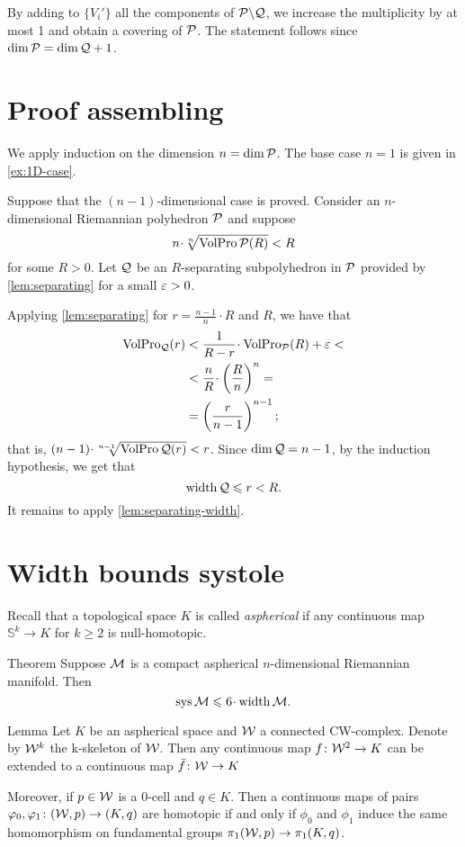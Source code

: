 By adding to  $\{V_i'\}$ all the components of $\mathcal{P}\backslash \mathcal{Q}$,
we increase the multiplicity by at most 1 and obtain a covering of $\mathcal{P}$.
The statement follows since $\dim \spc{P}= \dim \spc{Q}\z+1$.
\qeds

\section*{Proof assembling}

We apply induction on the dimension $n=\operatorname{\rm dim}\nolimits\mathcal{P}$.
The base case $n=1$ is given in \ref{ex:1D-case}.

Suppose that the  $(n-1)$-dimensional case is proved.
Consider an $n$-dimensional Riemannian polyhedron $\mathcal{P}$ and suppose
\[n\cdot \sqrt[n]{\VolPro\spc{P}(R)}< R\]
for some $R>0$.
Let $\mathcal{Q}$ be an $R$-separating subpolyhedron in $\mathcal{P}$ provided by \ref{lem:separating} for a small $\varepsilon>0$.

Applying  \ref{lem:separating} for $r=\tfrac{n-1}n\cdot R$ and $R$, we have that 
\begin{align*}
\VolPro_\spc{Q}(r) &< \frac 1{R-r}\cdot \VolPro_\spc{P}(R)+\eps<
\\
&<\frac {n}{R}\cdot\left(\frac{R}{n}\right)^n=
\\
&=\left(\frac{r}{n-1}\right)^{n-1};
\end{align*}
that is, $(n-1)\cdot \sqrt[n-1]{\VolPro\spc{Q}(r)}< r$.
Since $\operatorname{\rm dim}\nolimits\mathcal{Q}= n-1$, by the induction hypothesis, we get that
\[\operatorname{\rm width}\nolimits\mathcal{Q}\leqslant r<R.\]
It remains to apply \ref{lem:separating-width}.
\qeds





\section{Width bounds systole}

Recall that a topological space $K$ is called \emph{aspherical} if any continuous map $\mathbb{S}^k\to K$ for $k\ge 2$ is null-homotopic.

\begin{thm}{Theorem}\label{thm:sys<width}
Suppose $\mathcal{M}$ is a compact aspherical $n$-dimensional Riemannian manifold.
Then 
\[\sys\spc{M}\le 6 \cdot \width \spc{M}.\]
\end{thm}

\begin{thm}{Lemma}\label{lem:aspherical-homotopy}
Let $K$ be an aspherical space and $\mathcal{W}$ a connected CW-complex.
Denote by $\mathcal{W}^k$ the k-skeleton of $\mathcal{W}$.
Then any continuous map $f\colon\mathcal{W}^2\to K$ can be extended to a continuous map $\bar f\colon\mathcal{W}\to K$

Moreover, if $p\in \mathcal{W}$ is a 0-cell and $q\in K$.
Then a continuous maps of pairs $\varphi_0,\varphi_1\colon(\mathcal{W},p)\to(K,q)$ are homotopic if and only if $\phi_0$ and $\phi_1$ induce the same homomorphism on fundamental groups $\pi_1(\mathcal{W},p)\to\pi_1(K,q)$.
\end{thm}


